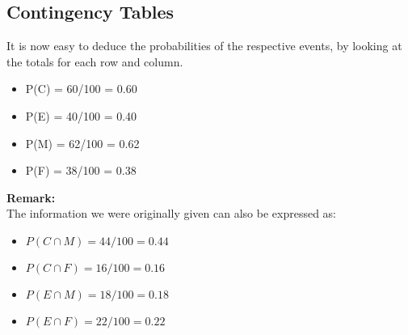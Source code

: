 \documentclass[]{report}
\begin{document}
{
	\subsection{Contingency Tables}
	It is now easy to deduce the probabilities of the respective events, by looking at the totals for each row and column.
	\begin{itemize}
		\item P(C) = 60/100 = 0.60
		\item P(E) = 40/100 = 0.40
		\item P(M) = 62/100 = 0.62
		\item P(F) = 38/100 = 0.38
	\end{itemize}
	\textbf{Remark:}\\
	The information we were originally given can also be expressed as:
	\begin{itemize}
		\item $P(C \cap M) = 44/100 = 0.44$
		\item $P(C \cap F) = 16/100 = 0.16$
		\item $P(E \cap M) = 18/100 = 0.18$
		\item $P(E \cap F) = 22/100 = 0.22$
	\end{itemize}
}
\end{document}
